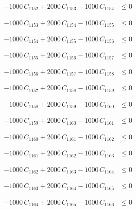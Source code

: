 \documentclass[a4paper,11pt]{article}
\begin{document}
\begin{align}
-1000\,C_{1152} + 2000\,C_{1153} - 1000\,C_{1154} &\leq 0 \nonumber
\end{align}

\begin{align}
-1000\,C_{1153} + 2000\,C_{1154} - 1000\,C_{1155} &\leq 0 \nonumber
\end{align}

\begin{align}
-1000\,C_{1154} + 2000\,C_{1155} - 1000\,C_{1156} &\leq 0 \nonumber
\end{align}

\begin{align}
-1000\,C_{1155} + 2000\,C_{1156} - 1000\,C_{1157} &\leq 0 \nonumber
\end{align}

\begin{align}
-1000\,C_{1156} + 2000\,C_{1157} - 1000\,C_{1158} &\leq 0 \nonumber
\end{align}

\begin{align}
-1000\,C_{1157} + 2000\,C_{1158} - 1000\,C_{1159} &\leq 0 \nonumber
\end{align}

\begin{align}
-1000\,C_{1158} + 2000\,C_{1159} - 1000\,C_{1160} &\leq 0 \nonumber
\end{align}

\begin{align}
-1000\,C_{1159} + 2000\,C_{1160} - 1000\,C_{1161} &\leq 0 \nonumber
\end{align}

\begin{align}
-1000\,C_{1160} + 2000\,C_{1161} - 1000\,C_{1162} &\leq 0 \nonumber
\end{align}

\begin{align}
-1000\,C_{1161} + 2000\,C_{1162} - 1000\,C_{1163} &\leq 0 \nonumber
\end{align}

\begin{align}
-1000\,C_{1162} + 2000\,C_{1163} - 1000\,C_{1164} &\leq 0 \nonumber
\end{align}

\begin{align}
-1000\,C_{1163} + 2000\,C_{1164} - 1000\,C_{1165} &\leq 0 \nonumber
\end{align}

\begin{align}
-1000\,C_{1164} + 2000\,C_{1165} - 1000\,C_{1166} &\leq 0 \nonumber
\end{align}
\end{document}
